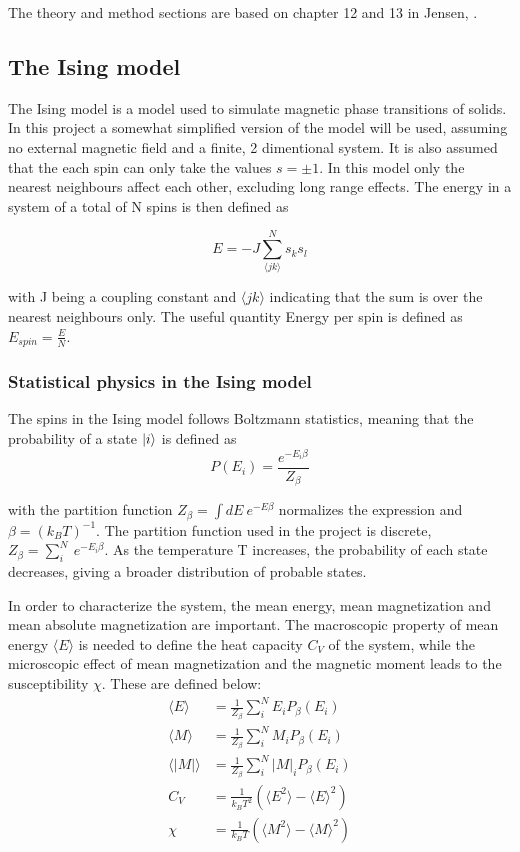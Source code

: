 
The theory and method sections are based on chapter 12 and 13 in Jensen, \cite{Jensen}.
\subsection{The Ising model}

The Ising model is a model used to simulate magnetic phase transitions of solids. In this project a somewhat simplified version of the model will be used, assuming no external magnetic field and a finite, 2 dimentional system. It is also assumed that the each spin can only take the values $ s  = \pm 1$.  In this model only the nearest neighbours affect each other, excluding long range effects. The energy in a system of a total of N spins is then defined as

\begin{equation}\label{eq: Energy_Ising}
E = -J \sum\limits_{\langle jk \rangle }^{N} s_ks_l
\end{equation}

with J being a coupling constant and  $ \langle jk \rangle $ indicating that the sum is over the nearest neighbours only. The useful quantity Energy per spin is defined as $ E_{spin}  = \frac{E}{N}$. 


\subsubsection{Statistical physics in the Ising model}

The spins in the Ising model follows Boltzmann statistics, meaning that the probability of a state $\ket{i}$ is defined as 
\begin{equation}\label{eq:boltzmann}
P(E_i) = \frac{e^{-E_i\beta}}{Z_{\beta}} 
\end{equation}

with the partition function $ Z_{\beta} = \int dE \ e^{-E\beta} $ normalizes the expression and $ \beta = (k_BT)^{-1} $. The partition function used in the project is discrete,$ Z_{\beta} = \sum\limits_{i}^{N} \ e^{-E_i\beta} $. As the temperature T increases, the probability of each state decreases, giving a broader distribution of probable states.  

In order to characterize the system, the mean energy, mean magnetization and mean absolute magnetization are important. The macroscopic property of mean energy $ \langle E \rangle $ is needed to define the heat capacity $ C_V$ of the system, while the microscopic effect of mean magnetization and the magnetic moment leads to the susceptibility $ \chi $. These are defined below: 
\begin{align}
\langle E \rangle &= \frac{1}{Z_{\beta}} \sum\limits_{i}^N E_i P_{\beta}(E_i)\\
\langle M \rangle &= \frac{1}{Z_{\beta}} \sum\limits_{i}^N M_i P_{\beta}(E_i)\\
\langle |M | \rangle &= \frac{1}{Z_{\beta}} \sum\limits_{i}^N |M|_i P_{\beta}(E_i)\\
 C_V &= \frac{1}{k_B T^2} \left( 	\langle E^2 \rangle - \langle E\rangle^2 	\right)\\
\chi &= \frac{1}{k_B T} \left( 	\langle M^2 \rangle - \langle M\rangle^2 	\right)
\end{align}


